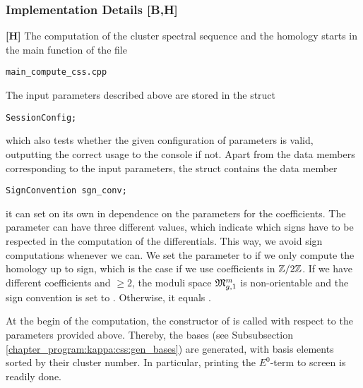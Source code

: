 \subsubsection{Implementation Details [B,H]}
\label{chapter_program:kappa:compute_css:implementation}

{\bf [H]} The computation of the cluster spectral sequence and the homology starts in the main function of the file 
\begin{lstlisting}
main_compute_css.cpp
\end{lstlisting}
The input parameters described above are stored in the struct
\begin{lstlisting}
SessionConfig;
\end{lstlisting}
which also tests whether the given configuration of parameters is valid, 
outputting the correct usage to the console if not.
Apart from the data members corresponding to the input parameters, 
the struct  contains the data member
\begin{lstlisting}
SignConvention sgn_conv;
\end{lstlisting}
it can set on its own in dependence on the parameters for the coefficients.
The  parameter can have three different values, 
which indicate which signs have to be respected in the computation of the differentials. 
This way, we avoid sign computations whenever we can.
We set the parameter to  if we only compute the homology up to sign, 
which is the case if we use coefficients in $\Z/2\Z$. 
If we have different coefficients and  $\geq 2$, the moduli space $\Modspc[1]$ is non-orientable and the sign convention is set to . 
Otherwise, it equals . 

At the begin of the computation, the constructor of  is called with respect to the parameters provided above.
Thereby, the bases (see Subsubsection \ref{chapter_program:kappa:css:gen_bases}) are generated, with basis elements sorted by their cluster number.
In particular, printing the $E^0$-term to screen is readily done.

